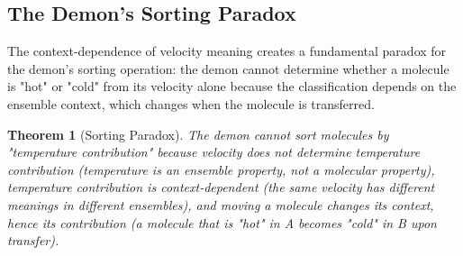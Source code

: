 \documentclass[12pt,a4paper]{article}
\newtheorem{theorem}{Theorem}[section]
\theoremstyle{definition}
\theoremstyle{remark}
\begin{document}
\subsection{The Demon's Sorting Paradox}

The context-dependence of velocity meaning creates a fundamental paradox for the demon's sorting operation: the demon cannot determine whether a molecule is "hot" or "cold" from its velocity alone because the classification depends on the ensemble context, which changes when the molecule is transferred.

\begin{theorem}[Sorting Paradox]
\label{thm:sorting_paradox}
The demon cannot sort molecules by "temperature contribution" because velocity does not determine temperature contribution (temperature is an ensemble property, not a molecular property), temperature contribution is context-dependent (the same velocity has different meanings in different ensembles), and moving a molecule changes its context, hence its contribution (a molecule that is "hot" in A becomes "cold" in B upon transfer).
\end{theorem}
\end{document}
